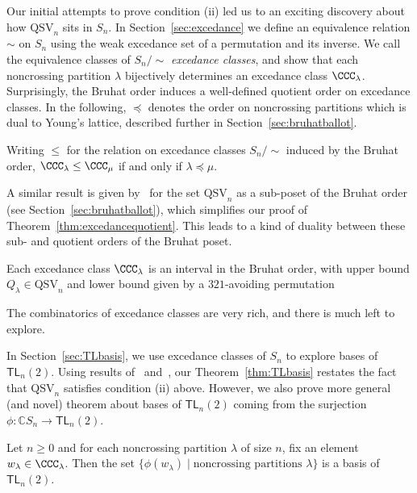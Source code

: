 \documentclass[submission]{FPSAC2024}
\theoremstyle{definition}
\theoremstyle{remark}
\numberwithin{equation}{section}
\newenvironment{introthm}[1]{
  \renewcommand\theequation{#1}
  \thm
}{\endthm}
\newenvironment{introcor}[1]{
  \renewcommand\theequation{#1}
  \cor
}{\endcor}
\newcommand{\CC}{\mathbb{C}}
\newcommand{\TL}{\mathsf{TL}}
\newcommand{\QSV}{\mathrm{QSV}}
\begin{document}
Our initial attempts to prove condition (ii) led us to an exciting discovery about how $\QSV_{n}$ sits in $S_{n}$.  
In Section~\ref{sec:excedance} we define an equivalence relation $\sim$ on $S_{n}$ using the weak excedance set of a permutation and its inverse.  
We call the equivalence classes of $S_{n}\big/\!\!\sim$ \emph{excedance classes}, and show that each noncrossing partition $\lambda$ bijectively determines an excedance class $\CCC_{\lambda}$.  
Surprisingly, the Bruhat order induces a well-defined quotient order on excedance classes.  
In the following, $\preceq$ denotes the order on noncrossing partitions which is dual to Young's lattice, described further in Section~\ref{sec:bruhatballot}.

\begin{introthm}{\ref{thm:excedancequotient}}
Writing $\le$ for the relation on excedance classes $S_{n}\big/\!\! \sim$ induced by the Bruhat order, $\CCC_{\lambda} \le \CCC_{\mu}$ if and only if $\lambda \preceq \mu$.
\end{introthm}

A similar result is given by~\cite{GW16} for the set $\QSV_{n}$ as a sub-poset of the Bruhat order (see Section~\ref{sec:bruhatballot}), which simplifies our proof of Theorem~\ref{thm:excedancequotient}.  This leads to a kind of duality between these sub- and quotient orders of the Bruhat poset.

\begin{introcor}{\ref{cor:interval}}
Each excedance class $\CCC_{\lambda}$ is an interval in the Bruhat order, with upper bound $Q_{\lambda}\in \QSV_n$ and lower bound given by a $321$-avoiding permutation
\end{introcor}

The combinatorics of excedance classes are very rich, and there is much left to explore.   

In Section~\ref{sec:TLbasis}, we use excedance classes of $S_{n}$ to explore bases of $\TL_{n}(2)$.  Using results of~\cite{GW16} and~\cite{Z02}, our Theorem~\ref{thm:TLbasis} restates the fact that $\QSV_{n}$ satisfies condition (ii) above.  However, we also prove more general (and novel) theorem about bases of $\TL_{n}(2)$ coming from the surjection $\phi: \CC S_{n} \to \TL_{n}(2)$.

\begin{introthm}{\ref{thm:TLbases}}
Let $n \ge 0$ and for each noncrossing partition $\lambda$ of size $n$, fix an element $w_{\lambda} \in \CCC_{\lambda}$. Then the set $\{\phi(w_{\lambda}) \;|\; \text{noncrossing partitions $\lambda$}\}$ is a basis of $\TL_{n}(2)$.
\end{introthm}
\end{document}
